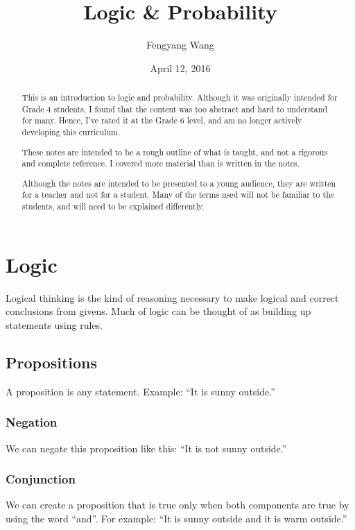 \documentclass[a4paper,10pt]{report}
\title{Logic \& Probability}
\author{Fengyang Wang}
\date{April 12, 2016}
\begin{document}
\begin{abstract}

 This is an introduction to logic and probability. Although it was originally
 intended for Grade 4 students, I found that the content was too abstract and
 hard to understand for many. Hence, I've rated it at the Grade 6 level, and am
 no longer actively developing this curriculum.

 These notes are intended to be a rough outline of what is taught, and not a
 rigorous and complete reference. I covered more material than is written in the
 notes.

 Although the notes are intended to be presented to a young audience, they are
 written for a teacher and not for a student. Many of the terms used will not be
 familiar to the students, and will need to be explained differently.

\end{abstract}

\maketitle

\tableofcontents

\chapter{Logic}

Logical thinking is the kind of reasoning necessary to make logical and correct
conclusions from givens. Much of logic can be thought of as building up
statements using rules.

\section{Propositions}

A proposition is any statement. Example: ``It is sunny outside.''

\subsection{Negation}

We can negate this proposition like this: ``It is not sunny outside.''

\subsection{Conjunction}

We can create a proposition that is true only when both components are true by
using the word ``and''. For example: ``It is sunny outside and it is warm
outside.''
\end{document}

